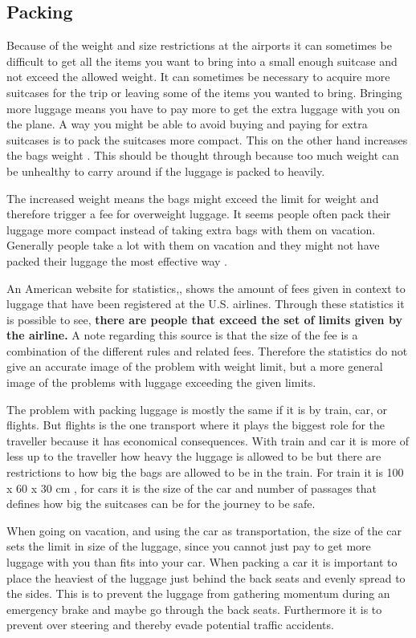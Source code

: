 \subsection*{Packing}

Because of the weight and size restrictions at the airports it can sometimes be difficult to get all the items you want to bring into a small enough suitcase and not exceed the allowed weight. It can sometimes be necessary to acquire more suitcases for the trip or leaving some of the items you wanted to bring. 
Bringing more luggage means you have to pay more to get the extra luggage with you on the plane. A way you might be able to avoid buying and paying for extra suitcases is to pack the suitcases more compact. This on the other hand increases the bags weight \citep{altombag}. This should be thought through because too much weight can be unhealthy to carry around if the luggage is packed to heavily.

The increased weight means the bags might exceed the limit for weight and therefore trigger a fee for overweight luggage.
It seems people often pack their luggage more compact instead of taking extra bags with them on vacation. Generally people take a lot with them on vacation and they might not have packed their luggage the most effective way \citep{airstat}.

An American website for statistics,\citep{airstat}, shows the amount of fees given in context to luggage that have been registered at the U.S. airlines. Through these statistics it is possible to see, \textbf{there are people that exceed the set of limits given by the airline.} A note regarding this source is that the size of the fee is a combination of the different rules and related fees. Therefore the statistics do not give an accurate image of the problem with weight limit, but a more general image of the problems with luggage exceeding the given limits.

The problem with packing luggage is mostly the same if it is by train, car, or flights. But flights is the one transport where it plays the biggest role for the traveller because it has economical consequences. With train and car it is more of less up to the traveller how heavy the luggage is allowed to be but there are restrictions to how big the bags are allowed to be in the train. For train it is 100 x 60 x 30 cm \citep{rulestrain}, for cars it is the size of the car and number of passages that defines how big the suitcases can be for the journey to be safe.

When going on vacation, and using the car as transportation, the size of the car sets the limit in size of the luggage, since you cannot just pay to get more luggage with you than fits into your car. When packing a car it is important to place the heaviest of the luggage just behind the back seats and evenly spread to the sides. This is to prevent the luggage from gathering momentum during an emergency brake and maybe go through the back seats. Furthermore it is to prevent over steering and thereby evade potential traffic accidents\citep{Farlig_bagage}.

